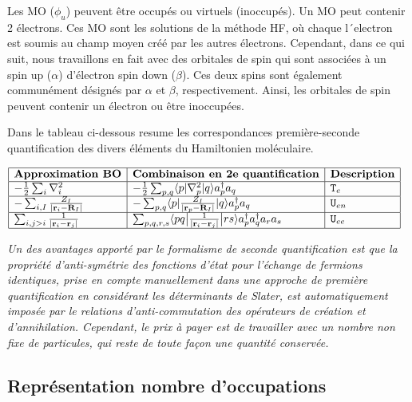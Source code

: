 Les MO ($\phi_u$) peuvent être occupés ou virtuels (inoccupés). Un MO
peut contenir 2 électrons. Ces MO sont les solutions de la méthode HF,
où chaque l´electron est soumis au champ moyen créé par les autres
électrons. Cependant, dans ce qui suit, nous travaillons en fait avec
des orbitales de spin qui sont associées à un spin up ($\alpha$)
d'électron spin down ($\beta$). Ces deux spins sont également
communément désignés par $\alpha$ et $\beta$, respectivement. Ainsi,
les orbitales de spin peuvent contenir un électron ou être inoccupées.

Dans le tableau ci-dessous resume les correspondances première-seconde
quantification des divers éléments du Hamiltonien moléculaire. 

$
\begin{array}{|l|l|l|}\hline
\textbf{Approximation BO}  &  \textbf{Combinaison en 2e quantification} &  \textbf{Description}
\\\hline
-\frac12\sum_i\nabla^2_i & -\frac12\sum_{p,q}\langle p|\nabla^2_p|q\rangle a^\dagger_p a_q & \mathtt{T}_e \\\hline
 -\sum_{i,I}\frac{Z_I}{|\mathbf{r}_i-\mathbf{R}_I|} &
 -\sum_{p,q} \langle p|\frac{Z_I}{|\mathbf{r}_p-\mathbf{R}_I|}|q\rangle a^\dagger_p a_q
 & \mathtt{U}_{en}\\\hline
\sum_{i,j>i}\frac{1}{|\mathbf{r}_i-\mathbf{r}_j|} & 
\sum_{p,q,r,s}\langle pq \big|\frac{1}{|\mathbf{r}_i-\mathbf{r}_j|}\big|rs\rangle a^\dagger_p a^\dagger_q a_r a_s & 
 \mathtt{U}_{ee}\\\hline
\end{array}
$

\emph{Un des avantages apporté par le formalisme de seconde
quantification est que la propriété d'anti-symétrie des fonctions d'état
pour l'échange de fermions identiques, prise en compte manuellement dans
une approche de première quantification en considérant les déterminants
de Slater, est automatiquement imposée par le relations
d'anti-commutation des opérateurs de création et d'annihilation.
Cependant, le prix à payer est de travailler avec un nombre non fixe de
particules, qui reste de toute façon une quantité conservée.}

    \hypertarget{repruxe9sentation-nombre-doccupations}{%
\subsection{Représentation nombre
d'occupations}\label{repruxe9sentation-nombre-doccupations}}

